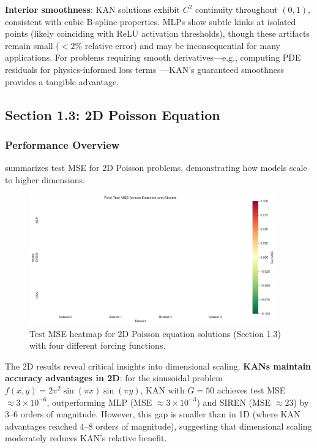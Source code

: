 \documentclass[11pt,a4paper]{article}
\begin{document}
\textbf{Interior smoothness}: KAN solutions exhibit $C^2$ continuity throughout $(0,1)$, consistent with cubic B-spline properties. MLPs show subtle kinks at isolated points (likely coinciding with ReLU activation thresholds), though these artifacts remain small ($<2\%$ relative error) and may be inconsequential for many applications. For problems requiring smooth derivatives—e.g., computing PDE residuals for physics-informed loss terms~\citep{raissi2019physics}—KAN's guaranteed smoothness provides a tangible advantage.

\subsection{Section 1.3: 2D Poisson Equation}

\subsubsection{Performance Overview}

 summarizes test MSE for 2D Poisson problems, demonstrating how models scale to higher dimensions.

\begin{figure}[htbp]
\centering
\includegraphics[width=0.95\textwidth]{../section1/analysis/section1_complete_analysis_20251021_143055/section1_3_analysis/01_comparative_metrics/all_datasets_heatmap_test.png}
\caption{Test MSE heatmap for 2D Poisson equation solutions (Section 1.3) with four different forcing functions.}
\label{fig:s13_heatmap}
\end{figure}

The 2D results reveal critical insights into dimensional scaling. \textbf{KANs maintain accuracy advantages in 2D}: for the sinusoidal problem $f(x,y) = 2\pi^2\sin(\pi x)\sin(\pi y)$, KAN with $G=50$ achieves test MSE $\approx 3 \times 10^{-6}$, outperforming MLP (MSE $\approx 3 \times 10^{-3}$) and SIREN (MSE $\approx 23$) by 3--6 orders of magnitude. However, this gap is smaller than in 1D (where KAN advantages reached 4--8 orders of magnitude), suggesting that dimensional scaling moderately reduces KAN's relative benefit.
\end{document}
